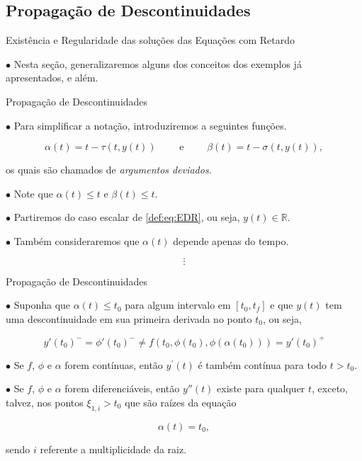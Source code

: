 \documentclass{beamer}
\newcommand{\R}{\mathbb{R}}
\theoremstyle{plain}
\theoremstyle{definition}
\begin{document}
\subsection{Propagação de Descontinuidades}
\begin{frame}{Existência e Regularidade das soluções das Equações com Retardo}

    $\bullet$ Nesta seção, generalizaremos alguns dos conceitos dos exemplos já apresentados, e além.
    
    \begin{exampleblock}{Propagação de Descontinuidades}

        $\bullet$ Para simplificar a notação, introduziremos a seguintes funções.

            \[
                \alpha(t)=t-\tau(t, y(t)) \qquad \text{ e } \qquad \beta(t)=t-\sigma(t, y(t)),
            \]

        \noindent
        os quais são chamados de \textit{argumentos deviados}. 

        $\bullet$ Note que $\alpha(t) \leq t$ e $\beta(t) \leq t$.

        $\bullet$ Partiremos do caso escalar de \eqref{def:eq:EDR}, ou seja, $y(t) \in \R$.

        $\bullet$ Também consideraremos que $\alpha(t)$ depende apenas do tempo.

        \noindent
        \[
            \vdots
        \]
         
    \end{exampleblock}


\end{frame}



\begin{frame}{Propagação de Descontinuidades}
    

    $\bullet$ Suponha que $\alpha(t) \leq t_0$ para algum intervalo em $[t_0, t_f]$ e que $y(t)$ tem uma descontinuidade em sua primeira derivada no ponto $t_0$, ou seja, 

    \[
        y'(t_0)^- = \phi'(t_0)^- \neq f(t_0, \phi(t_0), \phi(\alpha(t_0))) = y'(t_0)^+
    \]

    $\bullet$ Se \(f\), \(\phi\) e \(\alpha\) forem contínuas, então  \(y^{\prime}(t)\) é também contínua para todo \(t>t_{0}\). 
    
    $\bullet$ Se \(f\), \(\phi\) e \(\alpha\) forem diferenciáveis, então \(y''(t)\) existe para qualquer \(t\), exceto, talvez, nos pontos \(\xi_{1, i} >t_{0}\) que são raízes da equação


    \[
        \alpha(t)=t_{0},
    \]

    sendo $i$ referente a multiplicidade da raiz.

\end{frame}
\end{document}
